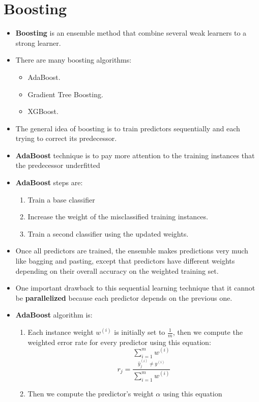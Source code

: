 \documentclass{article}
\begin{document}
	\section{Boosting}
	\begin{itemize}
		\item \textbf{Boosting} is an ensemble method that combine several weak learners to a strong learner.
		\item There are many boosting algorithms:
			\begin{itemize}
				\item AdaBoost.
				\item Gradient Tree Boosting.
				\item XGBoost.
    		\end{itemize}
    	\item The general idea of boosting is to train predictors sequentially and each trying to correct its predecessor.
    	\item \textbf{AdaBoost} technique is to pay more attention to the training instances that the predecessor underfitted
    	\item \textbf{AdaBoost} steps are:
    	\begin{enumerate}
    		\item Train a base classifier
    		\item Increase the weight of the misclassified training instances.
    		\item Train a second classifier using the updated weights.
    	\end{enumerate}
    	\item Once all predictors are trained, the ensemble makes predictions very much like bagging and pasting, except that predictors have different weights depending on their overall accuracy on the weighted training set.
    	\item One important drawback to this sequential learning technique that it cannot be \textbf{parallelized} because each predictor depends on the previous one.
    	\item \textbf{AdaBoost} algorithm is:
    	\begin{enumerate}
    		\item Each instance weight \textit{$w^{(i)}$} is initially set to \textbf{$\frac{1}{m}$}, then we compute the weighted error rate for every predictor using this equation:
    		\[ r_{j} = \frac{\underset{\hat{y}_{j}^{(i)} \neq y^{(i)}}{\sum_{i = 1}^{m} w^{(i)}}}{\sum_{i = 1}^{m} w^{(i)}}\]
    		\item Then we compute the predictor's weight $\alpha$ using this equation

\end{enumerate}
\end{itemize}
\end{document}
